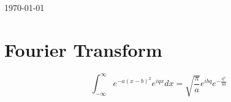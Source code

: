 \documentclass[letterpage]{article}
\begin{document}
\today
\section{Fourier Transform}
\begin{equation}
  \int_{-\infty}^{\infty} e^{-a(x-b)^2}e^{iqx}dx 
  = \sqrt{\frac{\pi}{a}}e^{ibq}e^{-\frac{q^2}{4a}}
\end{equation}
\end{document}
